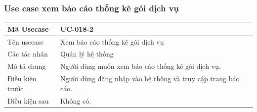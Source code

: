 \documentclass[12pt,a4paper]{article}
\begin{document}
\begin{table}[H]
    \end{table}

    \subsubsection*{Use case xem báo cáo thống kê gói dịch vụ}
    \begin{table}[H]
        \centering
        \begin{tabular}{|p{3.5cm}|p{11.5cm}|c|}
            \hline
            Mã Usecase & UC-018-2
            \\ \hline
            Tên usecase     & Xem báo cáo thống kê gói dịch vụ                             \\
            \hline
            Các tác nhân    & Quản lý hệ thống                                             \\
            \hline
            Mô tả chung     & Người dùng muốn xem báo cáo thống kê gói dịch vụ.            \\
            \hline

            Điều kiện trước & Người dùng đăng nhập vào hệ thống và truy cập trang báo cáo. \\
            \hline

            Điều kiện sau   & Không có.                                                    \\
            \hline


\end{tabular}
\end{table}
\end{document}
